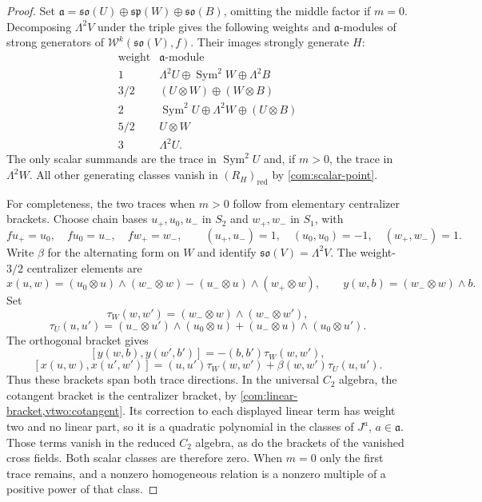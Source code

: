 \documentclass[11pt,a4paper]{amsart}
\numberwithin{equation}{section}
\theoremstyle{definition}
\theoremstyle{remark}
\newcommand{\spg}{\mathfrak{sp}}
\newcommand{\sog}{\mathfrak{so}}
\newcommand{\Sym}{\operatorname{Sym}}
\begin{document}
\begin{proof}
Set $\mathfrak a=\sog(U)\oplus\spg(W)\oplus\sog(B)$, omitting
the middle factor if $m=0$. Decomposing $\Lambda^2V$ under the
triple gives the following weights and $\mathfrak a$-modules of
strong generators of $\mathcal W^k(\sog(V),f)$. Their images strongly
generate $H$:
$$
\begin{array}{c|l}
\text{weight}&\mathfrak a\text{-module}\\\hline
1&\Lambda^2U\oplus\Sym^2W\oplus\Lambda^2B\\
3/2&(U\otimes W)\oplus(W\otimes B)\\
2&\Sym^2U\oplus\Lambda^2W\oplus(U\otimes B)\\
5/2&U\otimes W\\
3&\Lambda^2U.
\end{array}
$$
The only scalar summands are the trace in $\Sym^2U$ and, if
$m>0$, the trace in $\Lambda^2W$. All other generating classes
vanish in $(R_H)_{\mathrm{red}}$ by \cref{com:scalar-point}.

For completeness, the two traces when $m>0$ follow from elementary
centralizer brackets. Choose chain bases $u_+,u_0,u_-$ in $S_2$
and $w_+,w_-$ in $S_1$, with
$$
 fu_+=u_0,\quad fu_0=u_-,\quad fw_+=w_-,\qquad
 (u_+,u_-)=1,\quad(u_0,u_0)=-1,\quad(w_+,w_-)=1.
$$
Write $\beta$ for the alternating form on $W$ and identify
$\sog(V)=\Lambda^2V$. The weight-$3/2$ centralizer elements are
$$
 x(u,w)=(u_0\otimes u)\wedge(w_-\otimes w)
       -(u_-\otimes u)\wedge(w_+\otimes w),\qquad
 y(w,b)=(w_-\otimes w)\wedge b.
$$
Set
$$
 \tau_W(w,w')=(w_-\otimes w)\wedge(w_-\otimes w'),
$$
$$
 \tau_U(u,u')=(u_-\otimes u')\wedge(u_0\otimes u)
             +(u_-\otimes u)\wedge(u_0\otimes u').
$$
The orthogonal bracket gives
$$
 [y(w,b),y(w',b')]=-(b,b')\tau_W(w,w'),
$$
$$
 [x(u,w),x(u',w')]=(u,u')\tau_W(w,w')
                  +\beta(w,w')\tau_U(u,u').
$$
Thus these brackets span both trace directions. In the universal
$C_2$ algebra, the cotangent bracket is the centralizer bracket,
by \cref{com:linear-bracket,vtwo:cotangent}. Its correction to
each displayed linear term has weight two and no linear part,
so it is a quadratic polynomial in the classes of $J^a$, $a\in\mathfrak a$.
Those terms vanish in the reduced $C_2$ algebra, as do the
brackets of the vanished cross fields. Both
scalar classes are therefore zero. When $m=0$ only the first
trace remains, and a nonzero homogeneous relation is a nonzero
multiple of a positive power of that class.
\end{proof}
\end{document}
